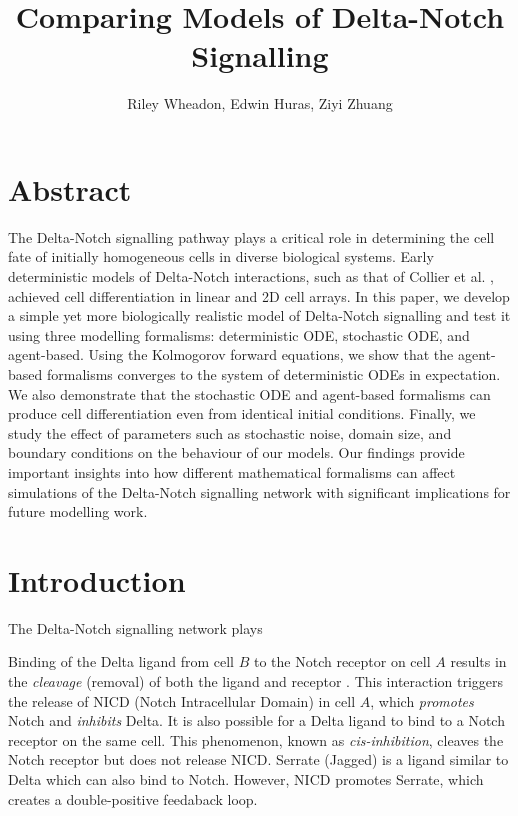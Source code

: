 \documentclass{article}
\title{Comparing Models of Delta-Notch Signalling}
\author{Riley Wheadon, Edwin Huras, Ziyi Zhuang}
\begin{document}
\maketitle

\begin{flushleft}

\section{Abstract}

The Delta-Notch signalling pathway plays a critical role in determining the cell fate of initially homogeneous cells in diverse biological systems.
Early deterministic models of Delta-Notch interactions, such as that of Collier et al. \cite{collier_pattern_1996}, achieved cell differentiation in linear and 2D cell arrays.
In this paper, we develop a simple yet more biologically realistic model of Delta-Notch signalling and test it using three modelling formalisms: deterministic ODE, stochastic ODE, and agent-based.
Using the Kolmogorov forward equations, we show that the agent-based formalisms converges to the system of deterministic ODEs in expectation.
We also demonstrate that the stochastic ODE and agent-based formalisms can produce cell differentiation even from identical initial conditions.
Finally, we study the effect of parameters such as stochastic noise, domain size, and boundary conditions on the behaviour of our models.
Our findings provide important insights into how different mathematical formalisms can affect simulations of the Delta-Notch signalling network with significant implications for future modelling work. 

\section{Introduction}

The Delta-Notch signalling network plays

\medskip

Binding of the Delta ligand from cell $B$ to the Notch receptor on cell $A$ results in the \emph{cleavage} (removal) of both the ligand and receptor \cite{bray_notch_2006}.
This interaction triggers the release of NICD (Notch Intracellular Domain) in cell $A$, which \emph{promotes} Notch and \emph{inhibits} Delta.
It is also possible for a Delta ligand to bind to a Notch receptor on the same cell. This phenomenon, known as \emph{cis-inhibition}, cleaves the Notch receptor but does not release NICD.
Serrate (Jagged) is a ligand similar to Delta which can also bind to Notch.
However, NICD promotes Serrate, which creates a double-positive feedaback loop.


\end{flushleft}
\end{document}
